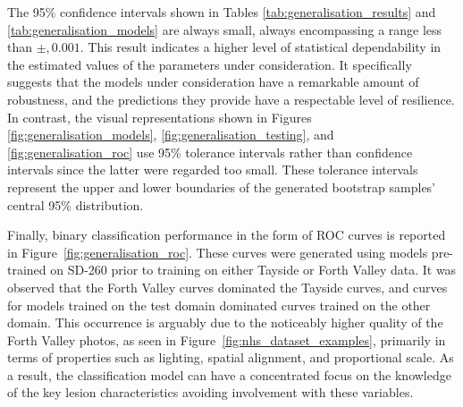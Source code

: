 The 95\% confidence intervals shown in Tables \ref{tab:generalisation_results} and \ref{tab:generalisation_models} are always small, always encompassing a range less than $\pm,0.001$. This result indicates a higher level of statistical dependability in the estimated values of the parameters under consideration. It specifically suggests that the models under consideration have a remarkable amount of robustness, and the predictions they provide have a respectable level of resilience. In contrast, the visual representations shown in Figures \ref{fig:generalisation_models}, \ref{fig:generalisation_testing}, and \ref{fig:generalisation_roc} use 95\% tolerance intervals rather than confidence intervals since the latter were regarded too small. These tolerance intervals represent the upper and lower boundaries of the generated bootstrap samples' central 95\% distribution.

Finally, binary classification performance in the form of ROC curves is reported in Figure~\ref{fig:generalisation_roc}. These curves were generated using models pre-trained on SD-260 prior to training on either Tayside or Forth Valley data. It was observed that the Forth Valley curves dominated the Tayside curves, and curves for models trained on the test domain dominated curves trained on the other domain. This occurrence is arguably due to the noticeably higher quality of the Forth Valley photos, as seen in Figure~\ref{fig:nhs_dataset_examples}, primarily in terms of properties such as lighting, spatial alignment, and proportional scale. As a result, the classification model can have a concentrated focus on the knowledge of the key lesion characteristics avoiding involvement with these variables.

